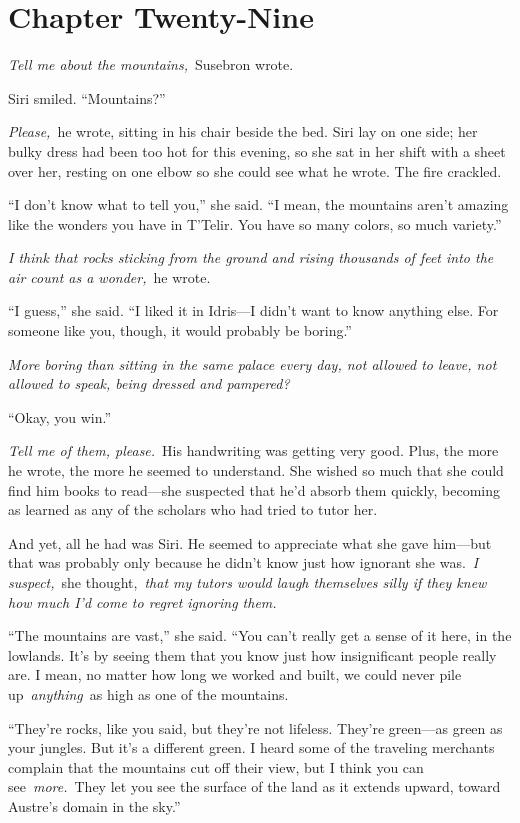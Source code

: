 \section{Chapter Twenty-Nine}

\textit{Tell me about the mountains,}~Susebron wrote.

Siri smiled. “Mountains?”

\textit{Please,}~he wrote, sitting in his chair beside the bed. Siri lay on one side; her bulky dress had been too hot for this evening, so she sat in her shift with a sheet over her, resting on one elbow so she could see what he wrote. The fire crackled.

“I don’t know what to tell you,” she said. “I mean, the mountains aren’t amazing like the wonders you have in T’Telir. You have so many colors, so much variety.”

\textit{I think that rocks sticking from the ground and rising thousands of feet into the air count as a wonder,}~he wrote.

“I guess,” she said. “I liked it in Idris—I didn’t want to know anything else. For someone like you, though, it would probably be boring.”

\textit{More boring than sitting in the same palace every day, not allowed to leave, not allowed to speak, being dressed and pampered?}

“Okay, you win.”

\textit{Tell me of them, please.}~His handwriting was getting very good. Plus, the more he wrote, the more he seemed to understand. She wished so much that she could find him books to read—she suspected that he’d absorb them quickly, becoming as learned as any of the scholars who had tried to tutor her.

And yet, all he had was Siri. He seemed to appreciate what she gave him—but that was probably only because he didn’t know just how ignorant she was.~\textit{I suspect,}~she thought,~\textit{that my tutors would laugh themselves silly if they knew how much I’d come to regret ignoring them.}

“The mountains are vast,” she said. “You can’t really get a sense of it here, in the lowlands. It’s by seeing them that you know just how insignificant people really are. I mean, no matter how long we worked and built, we could never pile up~\textit{anything}~as high as one of the mountains.

“They’re rocks, like you said, but they’re not lifeless. They’re green—as green as your jungles. But it’s a different green. I heard some of the traveling merchants complain that the mountains cut off their view, but I think you can see~\textit{more.}~They let you see the surface of the land as it extends upward, toward Austre’s domain in the sky.”

